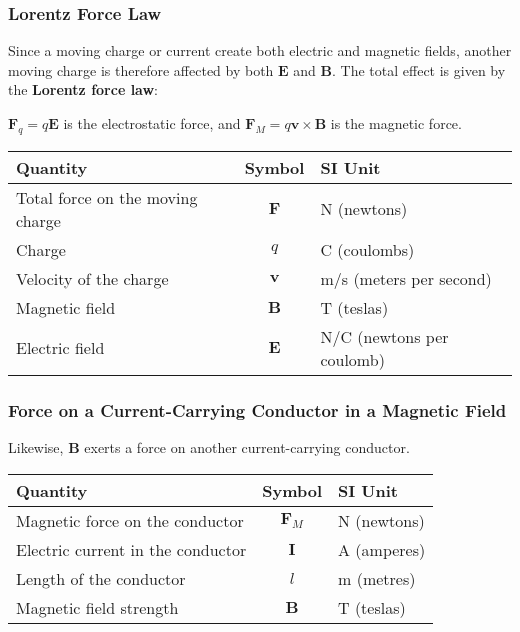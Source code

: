\documentclass[12pt,aspectratio=169]{beamer}
\newcommand{\mb}[1]{\mathbf{#1}}
\newcommand{\eq}[2]{\vspace{#1}{\Large\begin{displaymath}#2\end{displaymath}}}
\begin{document}
\begin{frame}
  \frametitle{Lorentz Force Law}
  Since a moving charge or current create both electric and magnetic fields,
  another moving charge is therefore affected by both $\mb{E}$ and $\mb{B}$.
  The total effect is given by the \textbf{Lorentz force law}:

  \eq{-.2in}{
    \boxed{\mb{F}=q(\mb{E}+\mb{v}\times\mb{B})}
  }

  \vspace{-.1in}$\mb{F}_q=q\mb{E}$ is the electrostatic force, and
  $\mb{F}_M=q\mb{v}\times\mb{B}$ is the magnetic force.

  \vspace{-.15in}
  \begin{center}
    \begin{tabular}{l|c|l}
      \rowcolor{pink}
      \textbf{Quantity} & \textbf{Symbol} & \textbf{SI Unit} \\ \hline
      Total force on the moving charge & $\mb{F}$ & \si{N} (newtons) \\
      Charge                 & $q$      & \si{C}   (coulombs) \\
      Velocity of the charge & $\mb{v}$ & \si{m/s} (meters per second)\\
      Magnetic field         & $\mb{B}$ & \si{T}   (teslas) \\
      Electric field         & $\mb{E}$ & \si{N/C} (newtons per coulomb)
    \end{tabular}
  \end{center}

\end{frame}


\begin{frame}
  \frametitle{Force on a Current-Carrying Conductor in a Magnetic Field}

  Likewise, $\mb{B}$ exerts a force on another current-carrying conductor.

  \eq{-.2in}{
    \boxed{F_M=\mb{I}l\times\mb{B}}
  }
  
  \vspace{-.1in}
  \begin{center}
    \begin{tabular}{l|c|l}
      \rowcolor{pink}
      \textbf{Quantity} & \textbf{Symbol} & \textbf{SI Unit} \\ \hline
      Magnetic force on the conductor   & $\mb{F}_M$ & \si{N} (newtons) \\
      Electric current in the conductor & $\mb{I}$   & \si{A} (amperes) \\
      Length of the conductor           & $l$        & \si{m} (metres)\\
      Magnetic field strength           & $\mb{B}$   & \si{T} (teslas)
    \end{tabular}
  \end{center}
\end{frame}
\end{document}
